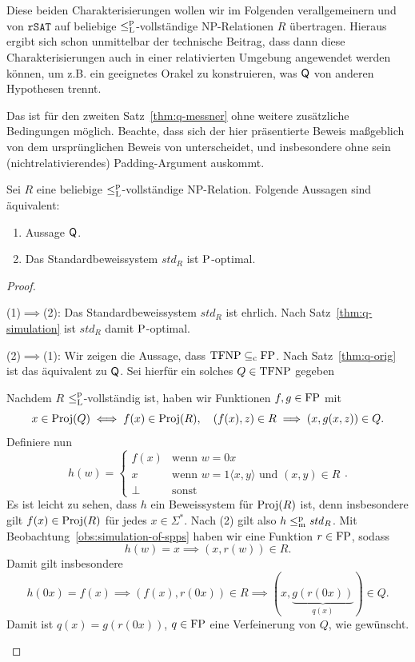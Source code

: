 Diese beiden Charakterisierungen wollen wir im Folgenden verallgemeinern und von $\mathtt{rSAT}$ auf beliebige $\leqlp$-vollständige NP-Relationen $R$ übertragen. 
Hieraus ergibt sich schon unmittelbar der technische Beitrag, dass dann diese Charakterisierungen auch in einer relativierten Umgebung angewendet werden können, um z.B. ein geeignetes Orakel zu konstruieren, was $\hQ$ von anderen Hypothesen trennt.

Das ist für den zweiten Satz~\ref{thm:q-messner} ohne weitere zusätzliche Bedingungen möglich. Beachte, dass sich der hier präsentierte Beweis maßgeblich von dem ursprünglichen Beweis von \textcite[vgl.][Thm.~5.2]{messner_simulation_2001} unterscheidet, und insbesondere ohne sein (nichtrelativierendes) Padding-Argument auskommt.
\begin{theorem}\label{thm:q-messner-generalized}
    Sei $R$ eine beliebige $\leqlp$-vollständige NP-Relation.
    Folgende Aussagen sind äquivalent:
    \begin{enumerate}
        \item Aussage $\hQ$.
        \item Das Standardbeweissystem $\mathit{std}_R$ ist $\P$-optimal.
    \end{enumerate}
\end{theorem}
\begin{proof}
    \begin{prooflist}
    \item (1)$\implies$(2): 
        Das Standardbeweissystem $\mathit{std}_R$ ist ehrlich. Nach Satz~\ref{thm:q-simulation} ist $\mathit{std}_R$ damit $\P$-optimal.

    \item (2)$\implies$(1): Wir zeigen die Aussage, dass $\TFNP\subseteqc\FP$.  Nach Satz~\ref{thm:q-orig} ist das äquivalent zu $\hQ$. Sei hierfür ein solches $Q\in\TFNP$ gegeben

    Nachdem $R$ $\leqlp$-vollständig ist, haben wir Funktionen $f,g\in\FP$ mit
    \[ x\in \Proj(Q)\iff  f(x)\in\Proj(R), \quad (f(x), z)\in R\implies (x,g(x,z))\in Q. \]
    Definiere nun
    \[ h(w) = \begin{cases} f(x) & \text{wenn $w=0x$}\\ x & \text{wenn $w=1\langle x, y\rangle$ und $(x,y)\in R$} \\  \bot & \text{sonst} \end{cases}.\]
    Es ist leicht zu sehen, dass $h$ ein Beweissystem für $\Proj(R)$ ist, denn insbesondere gilt $f(x)\in\Proj(R)$ für jedes $x\in\Sigma^*$.
    Nach (2) gilt also $h\leqmp \mathit{std}_R$. Mit Beobachtung~\ref{obs:simulation-of-spps} haben wir eine Funktion $r\in\FP$, sodass
    \[ h(w)=x \implies (x, r(w))\in R. \]
    Damit gilt insbesondere
    \[ h(0x)=f(x)\implies (f(x), r(0x))\in R \implies (x, \underbrace{g(r(0x))}_{q(x)})\in Q. \]
    Damit ist $q(x) = g(r(0x))$, $q\in\FP$ eine Verfeinerung von $Q$, wie gewünscht.
\end{prooflist}
\end{proof}


